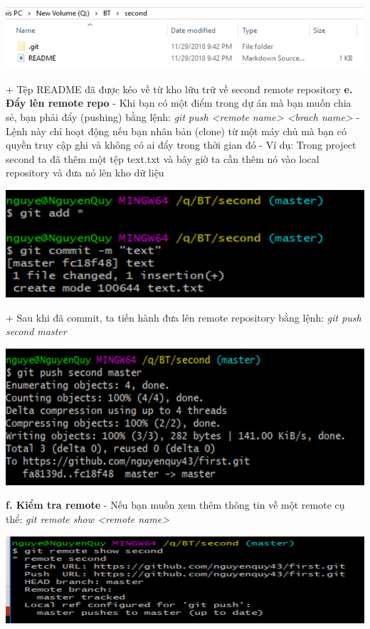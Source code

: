 \documentclass[12pt,a4paper]{report}
\begin{document}
	\includegraphics[width=0.8\linewidth]{screenshot037}

	\label{fig:screenshot037}
\vskip 0.4cm\vskip 0.4cm
+ Tệp README đã được kéo về từ kho lữu trữ về second remote repository\vskip 0.4cm
{\bf e. Đẩy lên remote repo} \vskip 0.4cm
- Khi bạn có một điểm trong dự án mà bạn muốn chia sẻ, bạn phải đẩy (pushing) bằng lệnh: {\it git push <remote name> <brach name> }\vskip 0.4cm
- Lệnh này chỉ hoạt động nếu bạn nhân bản (clone) từ một máy chủ mà bạn có quyền truy cập ghi và không có ai đẩy trong thời gian đó\vskip 0.4cm
- Ví dụ: Trong project second ta đã thêm một tệp text.txt và bây giờ ta cần thêm nó vào local repository và đưa nó lên kho dữ liệu\vskip 0.4cm

	\includegraphics[width=0.8\linewidth]{screenshot038}

	\label{fig:screenshot038}
\vskip 0.4cm\vskip 0.4cm
+ Sau khi đã commit, ta tiến hành đưa lên remote repository bằng lệnh: \textit{git push second master}
\vskip 0.4cm

	\includegraphics[width=0.8\linewidth]{screenshot039}

	\label{fig:screenshot039}
\vskip 0.4cm\vskip 0.4cm
{\bf f. Kiểm tra remote} \vskip 0.4cm
- Nếu bạn muốn xem thêm thông tin về một remote cụ thể: {\it git remote show <remote name>}\vskip 0.4cm


	\includegraphics[width=0.8\linewidth]{screenshot040}
\end{document}
